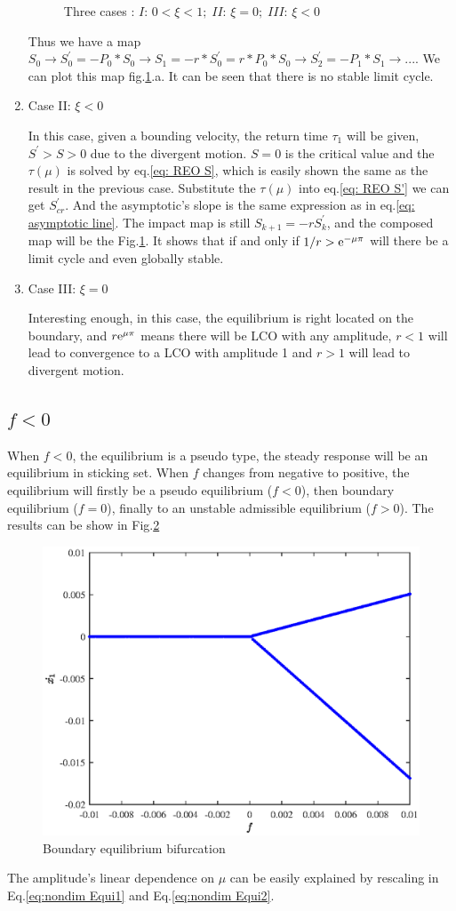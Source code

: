 \documentclass[a4paper,10pt]{article}
\begin{document}
\begin{enumerate}
\begin{figure}[htbp]
{			}
			\caption{Three cases : $I:\,0<\xi<1;\;II:\,\xi=0;\;III:\,\xi<0$}
			\label{fig: three cases for mu}
		\end{figure}
		Thus we have a map $S_0\rightarrow S^{'}_0=-P_0*S_0 \rightarrow S_1=-r*S^{'}_0=r*P_0*S_0\rightarrow S^{'}_2=-P_1*S_1\rightarrow ...$. We can plot this map fig.\ref{fig: three cases for mu}.a. It can be seen that there is no stable limit cycle.
		
		\item{Case II: $\xi<0$}
		
		
		In this case,  given a bounding velocity, the return time $\tau_1$ will be given, $S^{'}>S>0$ due to the divergent motion.  $S=0$ is the critical value and the $\tau(\mu)$
		is solved by eq.\ref{eq: REO S}, which is easily shown the same as the result in the previous case. Substitute the $\tau(\mu)$ into eq.\ref{eq: REO S'} we can get $S^{'}_{cr}$. And the asymptotic's slope is the same expression as in eq.\ref{eq: asymptotic line}. The impact map is still $S_{k+1}=-rS^{'}_{k}$, and the composed map will be the Fig.\ref{fig: three cases for mu}. It shows that if and only if $1/r>{\rm e}^{-\mu \pi}$ will there be a limit cycle and even globally stable.
		\item{Case III: $\xi=0$}
		
		Interesting enough, in this case, the equilibrium is right located on the boundary, and  $r{\rm e}^{\mu \pi}$ means there will be LCO with any amplitude, $r<1$ will lead to convergence to a LCO with amplitude 1 and $r>1$ will lead to divergent motion.
		
	\end{enumerate}
	
	\subsection{$f<0$} 
	When
	$f<0$, the equilibrium is a pseudo type, the steady response will be an equilibrium in sticking set.
	When $f$ changes from negative to positive, the equilibrium will firstly be a pseudo equilibrium ($f<0$), then boundary equilibrium ($f=0$), finally to an unstable admissible equilibrium ($f>0$). The results can be show in Fig.\ref{fig:SDOF BEB} 
	\begin{figure}[h!]
		\centering
		\includegraphics[width= 0.6 \textwidth]{BEB_Explanation/figures/SDOF_BEB.eps}
		\caption{Boundary equilibrium bifurcation}
		\label{fig:SDOF BEB}
	\end{figure}
	The amplitude's linear dependence on $\mu$ can be easily  explained by rescaling in Eq.\ref{eq:nondim Equi1} and Eq.\ref{eq:nondim Equi2}.
\end{document}

